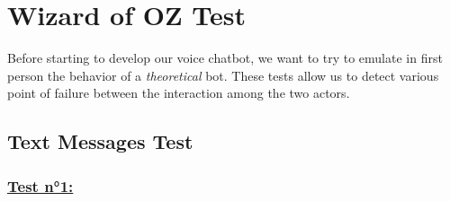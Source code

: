 \section{Wizard of OZ Test}

Before starting to develop our voice chatbot, we want to try to emulate in first person the behavior of a \textit{theoretical} bot. These tests allow us to detect various point of failure between the interaction among the two actors.

\subsection{Text Messages Test}

\subsubsection*{ \underline{Test n°1:} }

